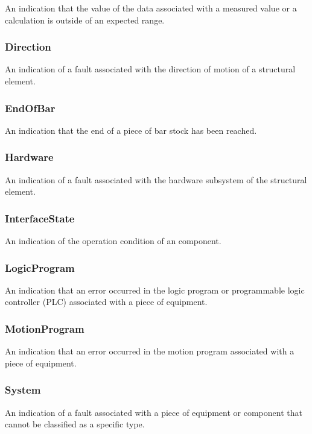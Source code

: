 An indication that the value of the data associated with a measured value or a calculation is outside of an expected range.



\subsubsection{Direction}
\label{sec:Direction}



An indication of a fault associated with the direction of motion of a \gls{structural element}.



\subsubsection{EndOfBar}
\label{sec:EndOfBar}



An indication that the end of a piece of bar stock has been reached.



\subsubsection{Hardware}
\label{sec:Hardware}



An indication of a fault associated with the hardware subsystem of the \gls{structural element}.



\subsubsection{InterfaceState}
\label{sec:InterfaceState}



An indication of the operation condition of an  component.



\subsubsection{LogicProgram}
\label{sec:LogicProgram}



An indication that an error occurred in the logic program or programmable logic controller (PLC) associated with a piece of equipment.



\subsubsection{MotionProgram}
\label{sec:MotionProgram}



An indication that an error occurred in the motion program associated with a piece of equipment.



\subsubsection{System}
\label{sec:System}



An indication of a fault associated with a piece of equipment or component that cannot be classified as a specific type.


